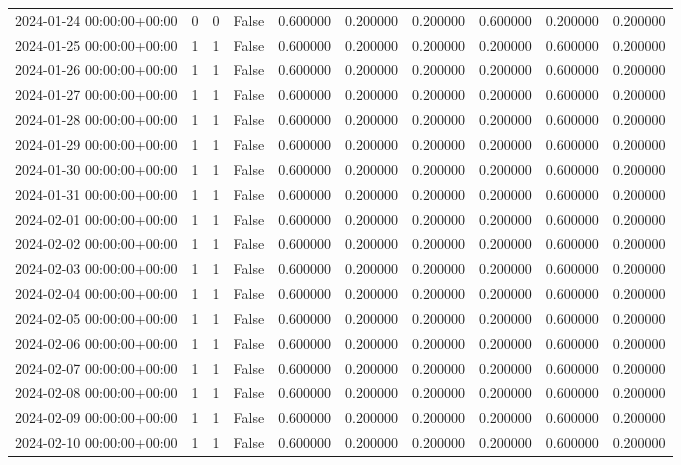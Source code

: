 \begin{tabular}{lrrrrrrrrr}
2024-01-24 00:00:00+00:00 & 0 & 0 & False & 0.600000 & 0.200000 & 0.200000 & 0.600000 & 0.200000 & 0.200000 \\
2024-01-25 00:00:00+00:00 & 1 & 1 & False & 0.600000 & 0.200000 & 0.200000 & 0.200000 & 0.600000 & 0.200000 \\
2024-01-26 00:00:00+00:00 & 1 & 1 & False & 0.600000 & 0.200000 & 0.200000 & 0.200000 & 0.600000 & 0.200000 \\
2024-01-27 00:00:00+00:00 & 1 & 1 & False & 0.600000 & 0.200000 & 0.200000 & 0.200000 & 0.600000 & 0.200000 \\
2024-01-28 00:00:00+00:00 & 1 & 1 & False & 0.600000 & 0.200000 & 0.200000 & 0.200000 & 0.600000 & 0.200000 \\
2024-01-29 00:00:00+00:00 & 1 & 1 & False & 0.600000 & 0.200000 & 0.200000 & 0.200000 & 0.600000 & 0.200000 \\
2024-01-30 00:00:00+00:00 & 1 & 1 & False & 0.600000 & 0.200000 & 0.200000 & 0.200000 & 0.600000 & 0.200000 \\
2024-01-31 00:00:00+00:00 & 1 & 1 & False & 0.600000 & 0.200000 & 0.200000 & 0.200000 & 0.600000 & 0.200000 \\
2024-02-01 00:00:00+00:00 & 1 & 1 & False & 0.600000 & 0.200000 & 0.200000 & 0.200000 & 0.600000 & 0.200000 \\
2024-02-02 00:00:00+00:00 & 1 & 1 & False & 0.600000 & 0.200000 & 0.200000 & 0.200000 & 0.600000 & 0.200000 \\
2024-02-03 00:00:00+00:00 & 1 & 1 & False & 0.600000 & 0.200000 & 0.200000 & 0.200000 & 0.600000 & 0.200000 \\
2024-02-04 00:00:00+00:00 & 1 & 1 & False & 0.600000 & 0.200000 & 0.200000 & 0.200000 & 0.600000 & 0.200000 \\
2024-02-05 00:00:00+00:00 & 1 & 1 & False & 0.600000 & 0.200000 & 0.200000 & 0.200000 & 0.600000 & 0.200000 \\
2024-02-06 00:00:00+00:00 & 1 & 1 & False & 0.600000 & 0.200000 & 0.200000 & 0.200000 & 0.600000 & 0.200000 \\
2024-02-07 00:00:00+00:00 & 1 & 1 & False & 0.600000 & 0.200000 & 0.200000 & 0.200000 & 0.600000 & 0.200000 \\
2024-02-08 00:00:00+00:00 & 1 & 1 & False & 0.600000 & 0.200000 & 0.200000 & 0.200000 & 0.600000 & 0.200000 \\
2024-02-09 00:00:00+00:00 & 1 & 1 & False & 0.600000 & 0.200000 & 0.200000 & 0.200000 & 0.600000 & 0.200000 \\
2024-02-10 00:00:00+00:00 & 1 & 1 & False & 0.600000 & 0.200000 & 0.200000 & 0.200000 & 0.600000 & 0.200000 \\

\end{tabular}
